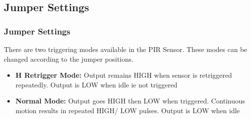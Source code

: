 \documentclass[table,10pt,red]{beamer}	%
\begin{document}
\subsection{Jumper Settings}
\begin{frame}
	\frametitle{Jumper Settings}
\pause 		
 		\color{black} 


\begin{minipage}[c]{0.6\textwidth}
There are two triggering modes available in the PIR Sensor. These modes can be changed according to the jumper positions.
			\begin{itemize}
\justifying
\pause
\item <+-|alert@+> \textbf{ H Retrigger Mode:} Output remains HIGH when sensor is retriggered repeatedly. Output is LOW when idle ie not triggered
\item <+-|alert@+> \textbf{Normal Mode: }Output goes HIGH then LOW when triggered. Continuous motion results in repeated HIGH/ LOW
pulses. Output is LOW when idle

\end{itemize}
		\end{minipage}
\begin{minipage}[c]{0.37\textwidth}


\end{minipage}
\end{frame}
\end{document}
